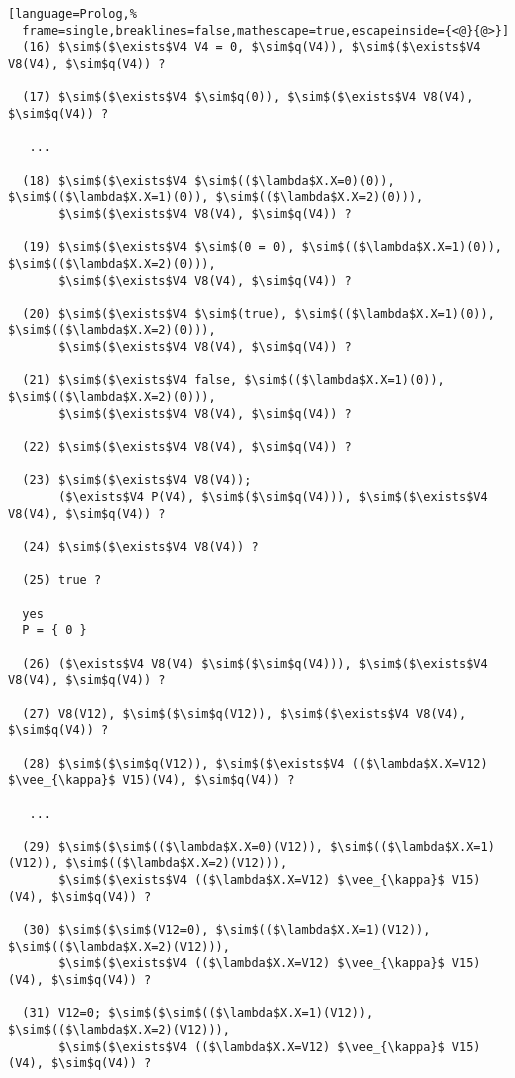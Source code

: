 \documentclass[inscr,ack,preface]{dithesis}
\theoremstyle{definition}
\begin{document}
\begin{lstlisting}[language=Prolog,%
  frame=single,breaklines=false,mathescape=true,escapeinside={<@}{@>}]
  (16) $\sim$($\exists$V4 V4 = 0, $\sim$q(V4)), $\sim$($\exists$V4 V8(V4), $\sim$q(V4)) ?

  (17) $\sim$($\exists$V4 $\sim$q(0)), $\sim$($\exists$V4 V8(V4), $\sim$q(V4)) ?

   ...

  (18) $\sim$($\exists$V4 $\sim$(($\lambda$X.X=0)(0)), $\sim$(($\lambda$X.X=1)(0)), $\sim$(($\lambda$X.X=2)(0))),
       $\sim$($\exists$V4 V8(V4), $\sim$q(V4)) ?

  (19) $\sim$($\exists$V4 $\sim$(0 = 0), $\sim$(($\lambda$X.X=1)(0)), $\sim$(($\lambda$X.X=2)(0))),
       $\sim$($\exists$V4 V8(V4), $\sim$q(V4)) ?

  (20) $\sim$($\exists$V4 $\sim$(true), $\sim$(($\lambda$X.X=1)(0)), $\sim$(($\lambda$X.X=2)(0))),
       $\sim$($\exists$V4 V8(V4), $\sim$q(V4)) ?

  (21) $\sim$($\exists$V4 false, $\sim$(($\lambda$X.X=1)(0)), $\sim$(($\lambda$X.X=2)(0))),
       $\sim$($\exists$V4 V8(V4), $\sim$q(V4)) ?

  (22) $\sim$($\exists$V4 V8(V4), $\sim$q(V4)) ?

  (23) $\sim$($\exists$V4 V8(V4));
       ($\exists$V4 P(V4), $\sim$($\sim$q(V4))), $\sim$($\exists$V4 V8(V4), $\sim$q(V4)) ?

  (24) $\sim$($\exists$V4 V8(V4)) ?

  (25) true ?

  yes
  P = { 0 }

  (26) ($\exists$V4 V8(V4) $\sim$($\sim$q(V4))), $\sim$($\exists$V4 V8(V4), $\sim$q(V4)) ?

  (27) V8(V12), $\sim$($\sim$q(V12)), $\sim$($\exists$V4 V8(V4), $\sim$q(V4)) ?

  (28) $\sim$($\sim$q(V12)), $\sim$($\exists$V4 (($\lambda$X.X=V12) $\vee_{\kappa}$ V15)(V4), $\sim$q(V4)) ?

   ...

  (29) $\sim$($\sim$(($\lambda$X.X=0)(V12)), $\sim$(($\lambda$X.X=1)(V12)), $\sim$(($\lambda$X.X=2)(V12))),
       $\sim$($\exists$V4 (($\lambda$X.X=V12) $\vee_{\kappa}$ V15)(V4), $\sim$q(V4)) ?

  (30) $\sim$($\sim$(V12=0), $\sim$(($\lambda$X.X=1)(V12)), $\sim$(($\lambda$X.X=2)(V12))),
       $\sim$($\exists$V4 (($\lambda$X.X=V12) $\vee_{\kappa}$ V15)(V4), $\sim$q(V4)) ?

  (31) V12=0; $\sim$($\sim$(($\lambda$X.X=1)(V12)), $\sim$(($\lambda$X.X=2)(V12))),
       $\sim$($\exists$V4 (($\lambda$X.X=V12) $\vee_{\kappa}$ V15)(V4), $\sim$q(V4)) ?


\end{lstlisting}
\end{document}
